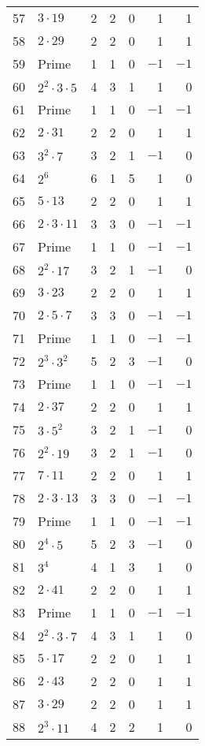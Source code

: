 \documentclass[12pt]{article}
\begin{document}
\begin{tabular}{|r|l|r|r|r|r|r|}
57 & $3 \cdot 19$ & 2 & 2 & 0 & 1 & 1 \\
58 & $2 \cdot 29$ & 2 & 2 & 0 & 1 & 1 \\
59 & Prime & 1 & 1 & 0 & $-1$ & $-1$ \\
60 & $2^2 \cdot 3 \cdot 5$ & 4 & 3 & 1 & 1 & 0 \\
61 & Prime & 1 & 1 & 0 & $-1$ & $-1$ \\
62 & $2 \cdot 31$ & 2 & 2 & 0 & 1 & 1 \\
63 & $3^2 \cdot 7$ & 3 & 2 & 1 & $-1$ & 0 \\
64 & $2^6$ & 6 & 1 & 5 & 1 & 0 \\
65 & $5 \cdot 13$ & 2 & 2 & 0 & 1 & 1 \\
66 & $2 \cdot 3 \cdot 11$ & 3 & 3 & 0 & $-1$ & $-1$ \\
67 & Prime & 1 & 1 & 0 & $-1$ & $-1$ \\
68 & $2^2 \cdot 17$ & 3 & 2 & 1 & $-1$ & 0 \\
69 & $3 \cdot 23$ & 2 & 2 & 0 & 1 & 1 \\
70 & $2 \cdot 5 \cdot 7$ & 3 & 3 & 0 & $-1$ & $-1$ \\
71 & Prime & 1 & 1 & 0 & $-1$ & $-1$ \\
72 & $2^3 \cdot 3^2$ & 5 & 2 & 3 & $-1$ & 0 \\
73 & Prime & 1 & 1 & 0 & $-1$ & $-1$ \\
74 & $2 \cdot 37$ & 2 & 2 & 0 & 1 & 1 \\
75 & $3 \cdot 5^2$ & 3 & 2 & 1 & $-1$ & 0 \\
76 & $2^2 \cdot 19$ & 3 & 2 & 1 & $-1$ & 0 \\
77 & $7 \cdot 11$ & 2 & 2 & 0 & 1 & 1 \\
78 & $2 \cdot 3 \cdot 13$ & 3 & 3 & 0 & $-1$ & $-1$ \\
79 & Prime & 1 & 1 & 0 & $-1$ & $-1$ \\
80 & $2^4 \cdot 5$ & 5 & 2 & 3 & $-1$ & 0 \\
81 & $3^4$ & 4 & 1 & 3 & 1 & 0 \\
82 & $2 \cdot 41$ & 2 & 2 & 0 & 1 & 1 \\
83 & Prime & 1 & 1 & 0 & $-1$ & $-1$ \\
84 & $2^2 \cdot 3 \cdot 7$ & 4 & 3 & 1 & 1 & 0 \\
85 & $5 \cdot 17$ & 2 & 2 & 0 & 1 & 1 \\
86 & $2 \cdot 43$ & 2 & 2 & 0 & 1 & 1 \\
87 & $3 \cdot 29$ & 2 & 2 & 0 & 1 & 1 \\
88 & $2^3 \cdot 11$ & 4 & 2 & 2 & 1 & 0 \\

\end{tabular}
\end{document}
